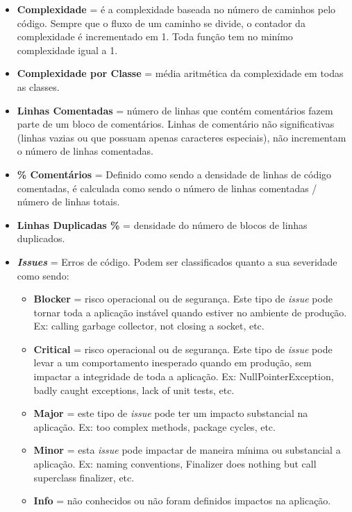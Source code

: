 \begin{itemize}
\item\textbf{Complexidade} = é a complexidade baseada no número de caminhos pelo código. Sempre que o fluxo de um caminho se divide, o contador da complexidade é incrementado em 1. Toda função tem no minímo complexidade igual a 1.
\item\textbf{Complexidade por Classe} = média aritmética da complexidade em todas as classes.
\item\textbf{Linhas Comentadas} = número de linhas que contém comentários fazem parte de um bloco de comentários. Linhas de comentário não significativas (linhas vazias ou que possuam apenas caracteres especiais), não incrementam o número de linhas comentadas.
\item\textbf{\% Comentários} = Definido como sendo a densidade de linhas de código comentadas, é calculada como sendo o número de linhas comentadas / número de linhas totais.


\item\textbf{Linhas Duplicadas \%} = densidade do número de blocos de linhas duplicados.


\item\textbf{\textit{Issues}} = Erros de código. Podem ser classificados quanto a sua severidade como sendo:
\begin{itemize}
\item\textbf{Blocker} = risco operacional ou de segurança. Este tipo de \textit{issue} pode tornar toda a aplicação instável quando estiver no ambiente de produção. Ex: calling garbage collector, not closing a socket, etc.
\item\textbf{Critical} = risco operacional ou de segurança. Este tipo de \textit{issue} pode levar a um comportamento inesperado quando em produção, sem impactar a integridade de toda a aplicação. Ex: NullPointerException, badly caught exceptions, lack of unit tests, etc.
\item\textbf{Major} = este tipo de \textit{issue} pode ter um impacto substancial na aplicação. Ex: too complex methods, package cycles, etc.
\item\textbf{Minor} = esta \textit{issue} pode impactar de maneira mínima ou substancial a aplicação. Ex: naming conventions, Finalizer does nothing but call superclass finalizer, etc.
\item\textbf{Info} = não conhecidos ou não foram definidos impactos na aplicação.
\end{itemize}


\end{itemize}
